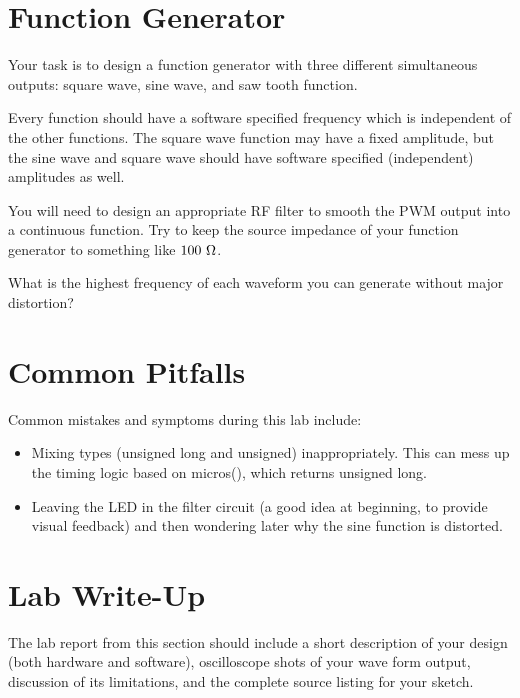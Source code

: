 \documentclass[12pt]{article}
\begin{document}
\section{Function Generator}

Your task is to design a function generator with three different simultaneous outputs:  square wave, sine wave, and saw tooth function.

Every function should have a software specified frequency which is independent of the other functions.
The square wave function may have a fixed amplitude, but the sine wave and square wave should have software specified (independent) amplitudes as well.

You will need to design an appropriate RF filter to smooth the PWM output into a continuous function.
Try to keep the source impedance of your function generator to something like $100~\rm \Omega$.

What is the highest frequency of each waveform you can generate without major distortion?

\section{Common Pitfalls}
Common mistakes and symptoms during this lab include:
\begin{itemize}
\item Mixing types (unsigned long and unsigned) inappropriately.  This can mess up the timing logic based on micros(), which returns unsigned long.
\item Leaving the LED in the filter circuit (a good idea at beginning, to provide visual feedback) and then wondering later why the sine function is distorted.
\end{itemize}

\section{Lab Write-Up}

The lab report from this section should include a short description of your design (both hardware and software), oscilloscope shots of your wave form output, discussion of its limitations, and the complete source listing for your sketch.
\end{document}
